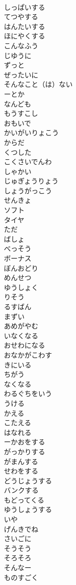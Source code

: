 \documentclass[8pt]{extreport}
\begin{document}
\begin{CJK}{UTF8}{min}
\\	しっぱいする	
\\	てつやする	
\\	はんたいする	
\\	ほにやくする	
\\	こんなふう	
\\	じゆうに	
\\	ずっと	
\\	ぜったいに	
\\	そんなこと（は）ない	
\\	ーとか	
\\	なんども	
\\	もうすこし	
\\	おもいで	
\\	かいがいりょこう	
\\	からだ	
\\	くつした	
\\	こくさいでんわ	
\\	しゃかい	
\\	じゅぎょうりょう	
\\	しょうがっこう	
\\	せんきょ	
\\	ソフト	
\\	タイヤ	
\\	ただ	
\\	ばしょ	
\\	べっそう	
\\	ボーナス	
\\	ぼんおどり	
\\	めんせつ	
\\	ゆうしょく	
\\	りそう	
\\	るすばん	
\\	まずい	
\\	あめがやむ	
\\	いなくなる	
\\	おせわになる	
\\	おなかがこわす	
\\	きにいる	
\\	ちがう	
\\	なくなる	
\\	わるぐちをいう	
\\	うける	
\\	かえる	
\\	こたえる	
\\	はなれる	
\\	ーかおをする	
\\	がっかりする	
\\	がまんする	
\\	せわをする	
\\	どうじょうする	
\\	バンクする	
\\	もどってくる	
\\	ゆうしょうする	
\\	いや	
\\	げんきでね	
\\	さいごに	
\\	そうそう	
\\	そろそろ	
\\	そんなー	
\\	ものすごく	
\end{CJK}
\end{document}
